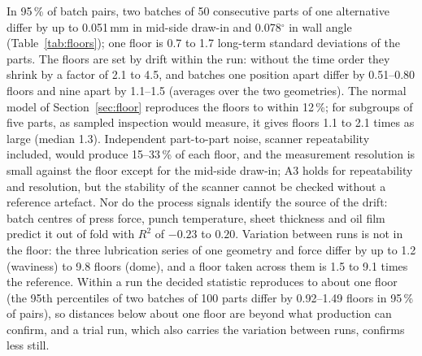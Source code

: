 \documentclass[pdflatex,sn-basic,lineno]{sn-jnl}
\providecommand{\DIFadd}[1]{{\protect\color{blue}\uwave{#1}}} %
\providecommand{\DIFaddbegin}{} %
\providecommand{\DIFaddend}{} %
\newcommand{\DIFaddincludegraphics}[2][]{{\color{blue}\fbox{\DIFOincludegraphics[#1]{#2}}}} %
\DeclareRobustCommand{\DIFaddbegin}{\DIFOaddbegin \let\includegraphics\DIFaddincludegraphics} %
\DeclareRobustCommand{\DIFaddend}{\DIFOaddend \let\includegraphics\DIFOincludegraphics} %
\begin{document}
In 95\,\% of batch pairs, two batches of 50 consecutive parts of one alternative differ by up to 0.051\,mm in mid-side draw-in and 0.078$^\circ$ in wall angle (Table~\ref{tab:floors}); one floor is 0.7 to 1.7 long-term standard deviations of the parts. The floors are set by drift within the run: without the time order they shrink by a factor of 2.1 to 4.5, and batches one position apart differ by 0.51--0.80 floors and nine apart by 1.1--1.5 (averages over the two geometries). The normal model of Section~\ref{sec:floor} reproduces the floors to within 12\,\%; for subgroups of five parts, as sampled inspection would measure, it gives floors 1.1 to 2.1 times as large (median 1.3). Independent part-to-part noise, scanner repeatability included, would produce 15--33\,\% of each floor, and the measurement resolution is small against the floor except for the mid-side draw-in; A3 holds for repeatability and \DIFaddbegin \DIFadd{measurement }\DIFaddend resolution, but the stability of the scanner cannot be checked without a reference artefact. Nor do the process signals identify the source of the drift: batch centres of press force, punch temperature, sheet thickness and oil film predict it out of fold with $R^2$ of $-0.23$ to $0.20$. Variation between runs is not in the floor: the three lubrication series of one geometry and force differ by up to 1.2 (waviness) to 9.8 floors (dome), and a floor taken across them is 1.5 to 9.1 times the reference. Within a run the decided statistic reproduces to about one floor (the 95th percentiles of two batches of 100 parts differ by 0.92--1.49 floors in 95\,\% of pairs), so distances below about one floor are beyond what production can confirm, and a trial run, which also carries the variation between runs, confirms less still.
\end{document}
